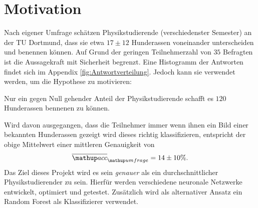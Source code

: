 \setcounter{page}{1}
\section*{Motivation}
Nach eigener Umfrage schätzen Physikstudierende (verschiedenster Semester)
an der TU Dortmund, dass sie etwa $17 \pm 12$ Hunderassen voneinander
unterscheiden und benennen können.
Auf Grund der geringen Teilnehmerzahl von $35$ Befragten
ist die Aussagekraft mit Sicherheit begrenzt. Eine Histogramm
der Antworten findet sich im Appendix \ref{fig:Antwortverteilung}.
Jedoch kann sie verwendet werden, um die Hypothese zu motivieren:
\begin{center}
  Nur ein gegen Null gehender Anteil der Physikstudierende schafft es $120$
  Hunderassen bennenen zu können.
\end{center}
Wird davon ausgegangen, dass die Teilnehmer immer wenn ihnen ein Bild einer bekannten
Hunderassen gezeigt wird dieses richtig klassifizieren,
entspricht der obige Mittelwert einer mittleren Genauigkeit von
\begin{equation}
  \label{eq:umfrage_mittlere_genauigkeit}
  \ov{\map{acc}}\ua{umfrage} = 14 \pm 10 \%.
\end{equation}
Das Ziel dieses Projekt wird es sein \emph{genauer} als ein durchschnittlicher
Physikstudierender zu sein.
Hierfür werden verschiedene neuronale Netzwerke entwickelt, optimiert und getestet.
Zusätzlich wird als alternativer Ansatz ein Random Forest als Klassifizierer verwendet.
